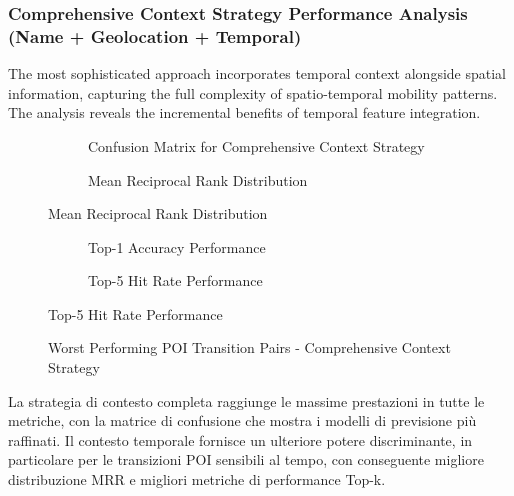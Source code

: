 \subsubsection{Comprehensive Context Strategy Performance Analysis (Name + Geolocation + Temporal)}

The most sophisticated approach incorporates temporal context alongside spatial information, capturing the full complexity of spatio-temporal mobility patterns. The analysis reveals the incremental benefits of temporal feature integration.

\begin{figure}[h]
\centering
\begin{subfigure}{0.48\textwidth}
\centering
\caption{Confusion Matrix for Comprehensive Context Strategy}
\label{fig:comprehensive_confusion}
\end{subfigure}
\hfill
\begin{subfigure}{0.48\textwidth}
\centering
\caption{Mean Reciprocal Rank Distribution}
\label{fig:comprehensive_mrr}
\end{subfigure}
\end{figure}

\begin{figure}[h]
\centering
\begin{subfigure}{0.48\textwidth}
\centering
\caption{Top-1 Accuracy Performance}
\label{fig:comprehensive_top1}
\end{subfigure}
\hfill
\begin{subfigure}{0.48\textwidth}
\centering
\caption{Top-5 Hit Rate Performance}
\label{fig:comprehensive_top5}
\end{subfigure}
\end{figure}

\begin{figure}[h]
\centering
\caption{Worst Performing POI Transition Pairs - Comprehensive Context Strategy}
\label{fig:comprehensive_worst_pairs}
\end{figure}

La strategia di contesto completa raggiunge le massime prestazioni in tutte le metriche, con la matrice di confusione che mostra i modelli di previsione più raffinati. Il contesto temporale fornisce un ulteriore potere discriminante, in particolare per le transizioni POI sensibili al tempo, con conseguente migliore distribuzione MRR e migliori metriche di performance Top-k.

